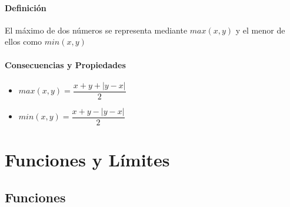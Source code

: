 \documentclass[12pt, fleqn]{report}                             %
\theoremstyle{break}                                            %
\begin{document}
            \subsection{Definición}

                El máximo de dos números se representa mediante $max(x, y)$ y el menor de 
                ellos como $min(x, y)$

            \vspace{1em}
            \subsection{Consecuencias y Propiedades}

                \begin{itemize}
                    \item $max(x, y) = \dfrac{x+y + |y-x|}{2}$
                    \item $min(x, y) = \dfrac{x+y - |y-x|}{2}$
                \end{itemize}


\part{Funciones y Límites}

    \chapter{Funciones}
        \clearpage

\end{document}
